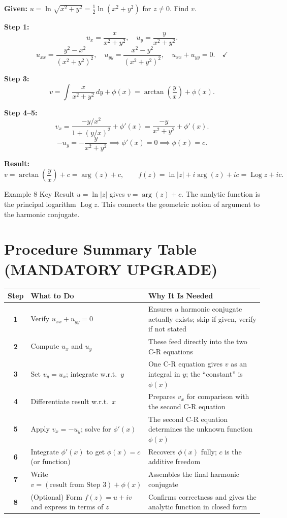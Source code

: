 \documentclass[12pt,a4paper]{article}
\begin{document}
\textbf{Given:} $u=\ln\sqrt{x^2+y^2}=\tfrac{1}{2}\ln(x^2+y^2)$ for $z\neq0$. Find $v$.

\medskip
\textbf{Step 1:}
\[
  u_x=\frac{x}{x^2+y^2},\quad u_y=\frac{y}{x^2+y^2}.
\]
\[
  u_{xx}=\frac{y^2-x^2}{(x^2+y^2)^2},\quad u_{yy}=\frac{x^2-y^2}{(x^2+y^2)^2},
  \quad u_{xx}+u_{yy}=0.\quad\checkmark
\]

\textbf{Step 3:}
\[
  v=\int\frac{x}{x^2+y^2}\,dy+\phi(x)=\arctan\!\left(\frac{y}{x}\right)+\phi(x).
\]

\textbf{Step 4--5:}
\[
  v_x=\frac{-y/x^2}{1+(y/x)^2}+\phi'(x)=\frac{-y}{x^2+y^2}+\phi'(x).
\]
\[
  -u_y=-\frac{y}{x^2+y^2} \implies \phi'(x)=0 \implies \phi(x)=c.
\]

\textbf{Result:}
\[
  \boxed{v=\arctan\!\left(\frac{y}{x}\right)+c=\arg(z)+c,
  \qquad f(z)=\ln|z|+i\arg(z)+ic=\operatorname{Log}z+ic.}
\]

\begin{learnbox}{Example 8 Key Result}
$u=\ln|z|$ gives $v=\arg(z)+c$. The analytic function is the principal logarithm
$\operatorname{Log}z$. This connects the geometric notion of argument to the harmonic
conjugate.
\end{learnbox}

\section{Procedure Summary Table (MANDATORY UPGRADE)}

\begin{center}
\begin{tabular}{@{}>{\bfseries}c p{5cm} p{6cm}@{}}
\toprule
Step & What to Do & Why It Is Needed \\
\midrule
1 & Verify $u_{xx}+u_{yy}=0$ &
    Ensures a harmonic conjugate actually exists; skip if given, verify if not stated \\
\midrule
2 & Compute $u_x$ and $u_y$ &
    These feed directly into the two C-R equations \\
\midrule
3 & Set $v_y=u_x$; integrate w.r.t.\ $y$ &
    One C-R equation gives $v$ as an integral in $y$; the ``constant'' is $\phi(x)$ \\
\midrule
4 & Differentiate result w.r.t.\ $x$ &
    Prepares $v_x$ for comparison with the second C-R equation \\
\midrule
5 & Apply $v_x=-u_y$; solve for $\phi'(x)$ &
    The second C-R equation determines the unknown function $\phi(x)$ \\
\midrule
6 & Integrate $\phi'(x)$ to get $\phi(x)=c$ (or function) &
    Recovers $\phi(x)$ fully; $c$ is the additive freedom \\
\midrule
7 & Write $v=(\text{result from Step 3})+\phi(x)$ &
    Assembles the final harmonic conjugate \\
\midrule
8 & (Optional) Form $f(z)=u+iv$ and express in terms of $z$ &
    Confirms correctness and gives the analytic function in closed form \\
\bottomrule
\end{tabular}
\end{center}
\end{document}
